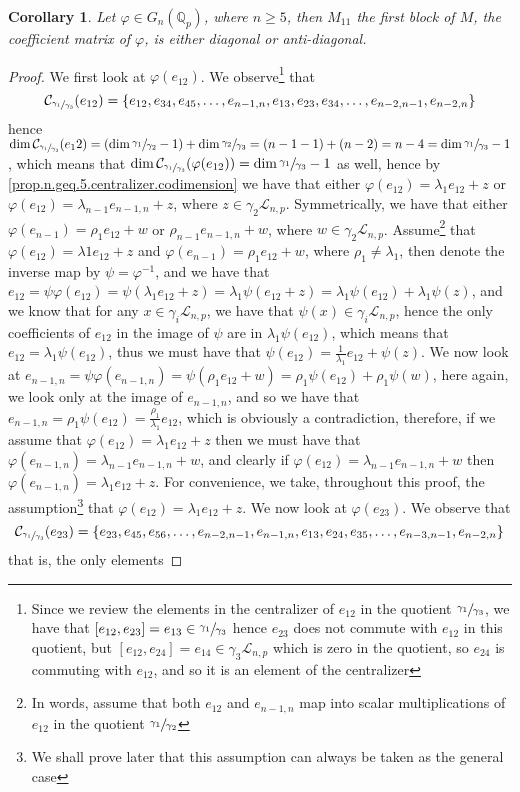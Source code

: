 \documentclass[12pt]{article}
\newtheorem{corollary}[theorem]{Corollary}
\begin{document}
\begin{corollary}
\label{m11.n.5}
Let $\varphi\in G_n(\mathbb{Q}_p)$, where $n\geq 5$, then $M_{11}$ the first block of $M$, the coefficient matrix of $\varphi$, is either diagonal or anti-diagonal.
\end{corollary}
\begin{proof}
We first look at $\varphi(e_{12})$. We observe\footnote{Since we review the elements in the centralizer of $e_{12}$ in the quotient $\sfrac{\gamma_1}{\gamma_3}$, we have that $[e_{12},e_{23}]=e_{13}\in\sfrac{\gamma_1}{\gamma_3}$ hence $e_{23}$ does not commute with $e_{12}$ in this quotient, but $[e_{12},e_{24}]=e_{14}\in\gamma_3\mathcal{L}_{n,p}$ which is zero in the quotient, so $e_{24}$ is commuting with $e_{12}$, and so it is an element of the centralizer} that \[\mathcal{C}_{\sfrac{\gamma_1}{\gamma_3}}(e_{12})=\{e_{12},e_{34},e_{45},\dots,e_{n-1,n},e_{13},e_{23},e_{34},\dots,e_{n-2,n-1},e_{n-2,n}\}\] hence $\dim\mathcal{C}_{\sfrac{\gamma_1}{\gamma_3}}(e_12)=(\dim\sfrac{\gamma_1}{\gamma_2}-1)+\dim\sfrac{\gamma_2}{\gamma_3}=(n-1-1)+(n-2)=n-4=\dim\sfrac{\gamma_1}{\gamma_3}-1$, which means that $\dim\mathcal{C}_{\sfrac{\gamma_1}{\gamma_3}}(\varphi(e_{12}))=\dim\sfrac{\gamma_1}{\gamma_3}-1$ as well, hence by \ref{prop.n.geq.5.centralizer.codimension} we have that either  $\varphi(e_{12})=\lambda_1 e_{12}+z$ or $\varphi(e_{12})=\lambda_{n-1}e_{n-1,n}+z$, where $z\in\gamma_2\mathcal{L}_{n,p}$. Symmetrically, we have that either $\varphi(e_{n-1})=\rho_1 e_{12}+w$ or $\rho_{n-1}e_{n-1,n}+w$, where $w\in\gamma_2\mathcal{L}_{n,p}$. Assume\footnote{In words, assume that both $e_{12}$ and $e_{n-1,n}$ map into scalar multiplications of $e_{12}$ in the quotient $\sfrac{\gamma_1}{\gamma_2}$} that $\varphi(e_{12})=\lambda1 e_{12}+z$ and $\varphi(e_{n-1})=\rho_1 e_{12}+w$, where $\rho_1\neq\lambda_1$, then denote the inverse map by $\psi=\varphi^{-1}$, and we have that $e_{12}=\psi\varphi(e_{12})=\psi(\lambda_1 e_{12}+z)=\lambda_1\psi(e_{12}+z)=\lambda_1\psi(e_{12})+\lambda_1\psi(z)$, and we know that for any $x\in\gamma_i\mathcal{L}_{n,p}$, we have that $\psi(x)\in\gamma_i\mathcal{L}_{n,p}$, hence the only coefficients of $e_{12}$ in the image of $\psi$ are in $\lambda_1\psi(e_{12})$, which means that $e_{12}=\lambda_1\psi(e_{12})$, thus we must have that $\psi(e_{12})=\frac{1}{\lambda_1}e_{12}+\psi(z)$. We now look at $e_{n-1,n}=\psi\varphi(e_{n-1,n})=\psi(\rho_1 e_{12}+w)=\rho_1\psi(e_{12})+\rho_1\psi(w)$, here again, we look only at the image of $e_{n-1,n}$, and so we have that $e_{n-1,n}=\rho_1\psi(e_{12})=\frac{\rho_1}{\lambda_1}e_{12}$, which is obviously a contradiction, therefore, if we assume that $\varphi(e_{12})=\lambda_1 e_{12}+z$ then we must have that $\varphi(e_{n-1,n})=\lambda_{n-1}e_{n-1,n}+w$, and clearly if $\varphi(e_{12})=\lambda_{n-1}e_{n-1,n}+w$ then $\varphi(e_{n-1,n})=\lambda_1 e_{12}+z$. For convenience, we take, throughout this proof, the assumption\footnote{We shall prove later that this assumption can always be taken as the general case} that $\varphi(e_{12})=\lambda_1 e_{12}+z$. We now look at $\varphi(e_{23})$. We observe that \[\mathcal{C}_{\sfrac{\gamma_1}{\gamma_3}}(e_{23})=\{e_{23},e_{45},e_{56},\dots,e_{n-2,n-1},e_{n-1,n},e_{13},e_{24},e_{35},\dots,e_{n-3,n-1},e_{n-2,n}\}\] that is, the only elements 
\end{proof}
\end{document}
